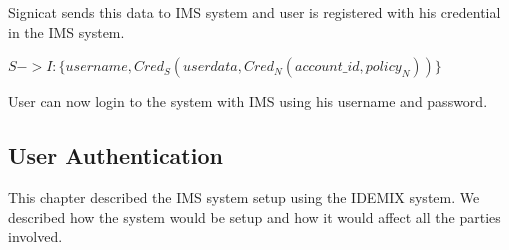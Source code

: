 \begin{enumerate}
Signicat sends this data to IMS system and user is registered with his credential in the IMS system.
\begin{center}
	$S -> I : \{username,Cred_S(userdata,Cred_N(account\_id,policy_N))\}$
\end{center}
User can now login to the system with IMS using his username and password.
\end{enumerate}

\subsection{User Authentication}


This chapter described the IMS system setup using the IDEMIX system. We described how the system would be setup and how it would affect all the parties involved.


